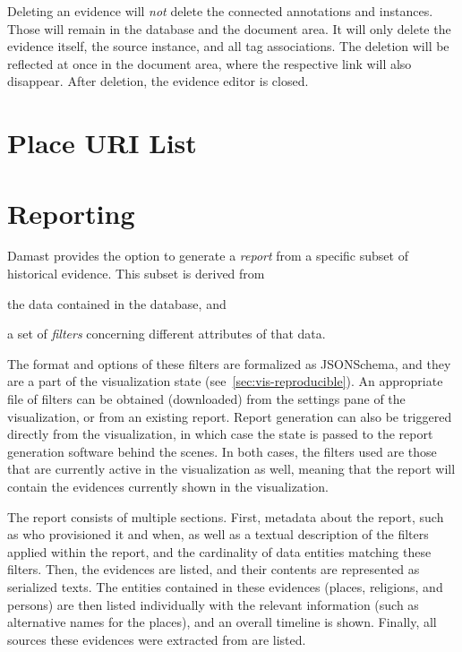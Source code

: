 Deleting an evidence will \emph{not} delete the connected annotations and instances.
Those will remain in the database and the document area.
It will only delete the evidence itself, the source instance, and all tag associations.
The deletion will be reflected at once in the document area, where the respective link will also disappear.
After deletion, the evidence editor is closed.


\section{Place URI List}


\section{Reporting}
\label{sec:reporting}

Damast provides the option to generate a \emph{report} from a specific subset of historical evidence.
This subset is derived from
\begin{enumerate*}[label=(\arabic*)]
  \item the data contained in the database, and
  \item a set of \emph{filters} concerning different attributes of that data.
\end{enumerate*}
The format and options of these filters are formalized as JSONSchema, and they are a part of the visualization state (see~\cref{sec:vis-reproducible}).
An appropriate file of filters can be obtained (downloaded) from the settings pane of the visualization, or from an existing report.
Report generation can also be triggered directly from the visualization, in which case the state is passed to the report generation software behind the scenes.
In both cases, the filters used are those that are currently active in the visualization as well, meaning that the report will contain the evidences currently shown in the visualization.

The report consists of multiple sections.
First, metadata about the report, such as who provisioned it and when, as well as a textual description of the filters applied within the report, and the cardinality of data entities matching these filters.
Then, the evidences are listed, and their contents are represented as serialized texts.
The entities contained in these evidences (places, religions, and persons) are then listed individually with the relevant information (such as alternative names for the places), and an overall timeline is shown.
Finally, all sources these evidences were extracted from are listed.

